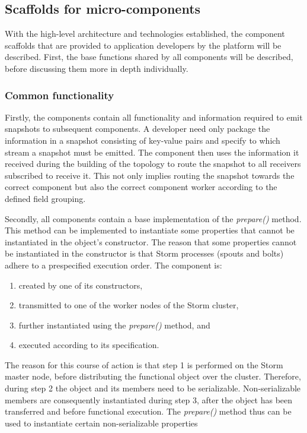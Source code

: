 \subsection{Scaffolds for micro-components}
With the high-level architecture and technologies established, the component scaffolds that are provided to application developers by the platform will be described. First, the base functions shared by all components will be described, before discussing them more in depth individually.

\subsubsection*{Common functionality}
Firstly, the components contain all functionality and information required to emit snapshots to subsequent components. A developer need only package the information in a snapshot consisting of key-value pairs and specify to which stream a snapshot must be emitted. The component then uses the information it received during the building of the topology to route the snapshot to all receivers subscribed to receive it. This not only implies routing the snapshot towards the correct component but also the correct component worker according to the defined field grouping.

Secondly, all components contain a base implementation of the \emph{prepare()} method. This method can be implemented to instantiate some properties that cannot be instantiated in the object's constructor. The reason that some properties cannot be instantiated in the constructor is that Storm processes (spouts and bolts) adhere to a prespecified execution order. The component is:
\begin{enumerate}
\nospace
\item created by one of its constructors,
\item transmitted to one of the worker nodes of the Storm cluster,
\item further instantiated using the \emph{prepare()} method, and
\item executed according to its specification.
\end{enumerate}
The reason for this course of action is that step 1 is performed on the Storm master node, before distributing the functional object over the cluster. Therefore, during step 2 the object and its members need to be serializable. Non-serializable members are consequently instantiated during step 3, after the object has been transferred and before functional execution. The \emph{prepare()} method thus can be used to instantiate certain non-serializable properties

